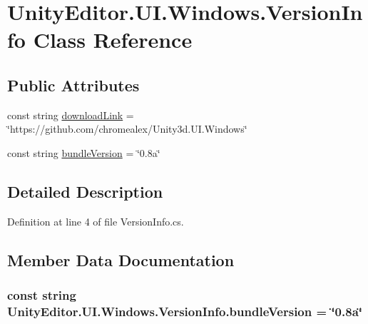 \hypertarget{class_unity_editor_1_1_u_i_1_1_windows_1_1_version_info}{}\section{Unity\+Editor.\+U\+I.\+Windows.\+Version\+Info Class Reference}
\label{class_unity_editor_1_1_u_i_1_1_windows_1_1_version_info}
\subsection*{Public Attributes}
\begin{DoxyCompactItemize}
\item 
const string \hyperlink{class_unity_editor_1_1_u_i_1_1_windows_1_1_version_info_ad6a29d1089410776441d777edaa95b59}{download\+Link} = \char`\"{}https\+://github.\+com/chromealex/Unity3d.\+U\+I.\+Windows\char`\"{}
\item 
const string \hyperlink{class_unity_editor_1_1_u_i_1_1_windows_1_1_version_info_a024ffd7dfaecbebfe75852aa84b9813d}{bundle\+Version} = \char`\"{}0.\+8a\char`\"{}
\end{DoxyCompactItemize}


\subsection{Detailed Description}


Definition at line 4 of file Version\+Info.\+cs.



\subsection{Member Data Documentation}
\hypertarget{class_unity_editor_1_1_u_i_1_1_windows_1_1_version_info_a024ffd7dfaecbebfe75852aa84b9813d}{}
\subsubsection[{bundle\+Version}]{\setlength{\rightskip}{0pt plus 5cm}const string Unity\+Editor.\+U\+I.\+Windows.\+Version\+Info.\+bundle\+Version = \char`\"{}0.\+8a\char`\"{}}\label{class_unity_editor_1_1_u_i_1_1_windows_1_1_version_info_a024ffd7dfaecbebfe75852aa84b9813d}


